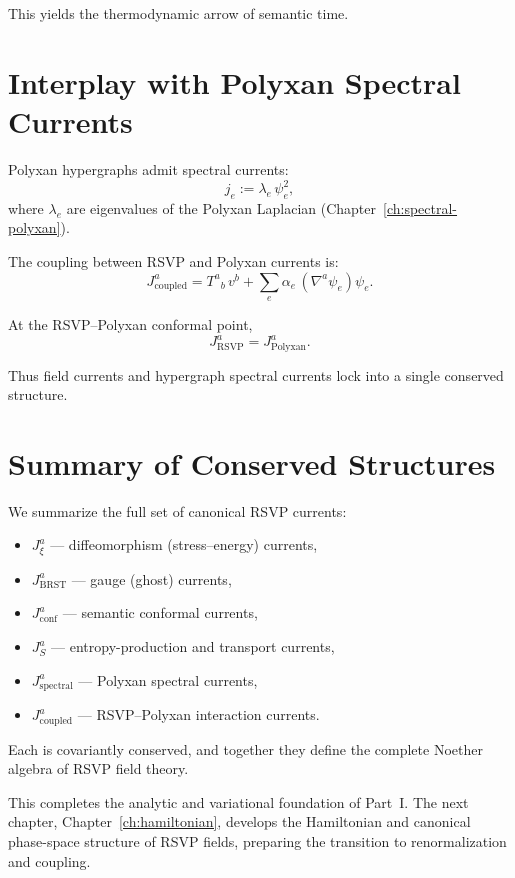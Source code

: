 This yields the thermodynamic arrow of semantic time.

\section{Interplay with Polyxan Spectral Currents}

Polyxan hypergraphs admit spectral currents:
\[
j_e := \lambda_e\, \psi_e^2,
\]
where $\lambda_e$ are eigenvalues of the Polyxan Laplacian
(Chapter~\ref{ch:spectral-polyxan}).

The coupling between RSVP and Polyxan currents is:
\[
J^a_{\mathrm{coupled}}
  = T^a{}_b\, v^b + \sum_e \alpha_e\, (\nabla^a \psi_e)\psi_e.
\]

\begin{proposition}
At the RSVP–Polyxan conformal point,
\[
J^a_{\mathrm{RSVP}} = J^a_{\mathrm{Polyxan}}.
\]
\end{proposition}

Thus field currents and hypergraph spectral currents lock into a single
conserved structure.

\section{Summary of Conserved Structures}

We summarize the full set of canonical RSVP currents:

\begin{itemize}
\item $J^a_\xi$ — diffeomorphism (stress–energy) currents,
\item $J^a_{\mathrm{BRST}}$ — gauge (ghost) currents,
\item $J^a_{\mathrm{conf}}$ — semantic conformal currents,
\item $J^a_S$ — entropy-production and transport currents,
\item $J^a_{\mathrm{spectral}}$ — Polyxan spectral currents,
\item $J^a_{\mathrm{coupled}}$ — RSVP–Polyxan interaction currents.
\end{itemize}

Each is covariantly conserved, and together they define the complete Noether
algebra of RSVP field theory.

This completes the analytic and variational foundation of Part~I.  
The next chapter, Chapter~\ref{ch:hamiltonian}, develops the Hamiltonian and
canonical phase-space structure of RSVP fields, preparing the transition to
renormalization and coupling.
